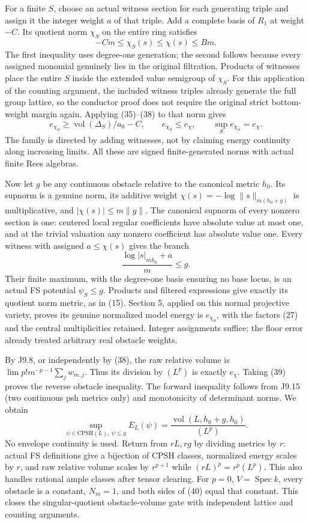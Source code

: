 \documentclass[
  10pt,
]{article}
\begin{document}
For a finite \(S\), choose an actual witness section for each generating
triple and assign it the integer weight \(a\) of that triple. Add a
complete basis of \(R_1\) at weight \(-C\). Its quotient norm \(\chi_S\)
on the entire ring satisfies \[ -Cm\leq\chi_S(s)\leq\chi(s)\leq Bm. \]
The first inequality uses degree-one generation; the second follows
because every assigned monomial genuinely lies in the original
filtration. Products of witnesses place the entire \(S\) inside the
extended value semigroup of \(\chi_S\). For this application of the
counting argument, the included witness triples already generate the
full group lattice, so the conductor proof does not require the original
strict bottom-weight margin again. Applying (35)--(38) to that norm
gives
\[ e_{\chi_S}\geq\operatorname{vol}(\Delta_S)/a_0-C,\qquad e_{\chi_S}\leq e_\chi,\qquad
 \sup_Se_{\chi_S}=e_\chi.                                                                     \tag{39}\]
The family is directed by adding witnesses, not by claiming energy
continuity along increasing limits. All these are signed
finite-generated norms with actual finite Rees algebras.

Now let \(g\) be any continuous obstacle relative to the canonical
metric \(h_0\). Its supnorm is a genuine norm, its additive weight
\(\chi(s)=-\log\|s\|_{m(h_0+g)}\) is multiplicative, and
\(|\chi(s)|\leq m\|g\|\). The canonical supnorm of every nonzero section
is one: centered local regular coefficients have absolute value at most
one, and at the trivial valuation any nonzero coefficient has absolute
value one. Every witness with assigned \(a\leq\chi(s)\) gives the branch
\[ \frac{\log|s|_{mh_0}+a}{m}\leq g. \] Their finite maximum, with the
degree-one basis ensuring no base locus, is an actual FS potential
\(\psi_S\leq g\). Products and filtered expressions give exactly its
quotient norm metric, as in (15). Section 5, applied on this normal
projective variety, proves its genuine normalized model energy is
\(e_{\chi_S}\), with the factors (27) and the central multiplicities
retained. Integer assignments suffice; the floor error already treated
arbitrary real obstacle weights.

By J9.8, or independently by (38), the raw relative volume is
\(\lim p!m^{-p-1}\sum_j w_{m,j}\). Thus its division by \((L^p)\) is
exactly \(e_\chi\). Taking (39) proves the reverse obstacle inequality.
The forward inequality follows from J9.15 (two continuous psh metrics
only) and monotonicity of determinant norms. We obtain
\[ \boxed{\sup_{\psi\in\mathrm{CPSH}(L),\ \psi\leq g}E_L(\psi)
       =\frac{\operatorname{vol}(L,h_0+g,h_0)}{(L^p)}.}                                      \tag{40}\]
No envelope continuity is used. Return from \(rL,rg\) by dividing
metrics by \(r\): actual FS definitions give a bijection of CPSH
classes, normalized energy scales by \(r\), and raw relative volume
scales by \(r^{p+1}\) while \((rL)^p=r^p(L^p)\). This also handles
rational ample classes after tensor clearing. For \(p=0\),
\(V=\operatorname{Spec}k\), every obstacle is a constant, \(N_m=1\), and
both sides of (40) equal that constant. This closes the
singular-quotient obstacle-volume gate with independent lattice and
counting arguments.
\end{document}
